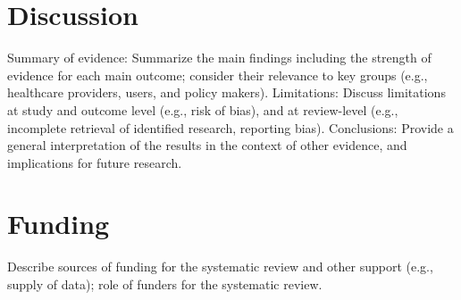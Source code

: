\documentclass{article}\usepackage[]{graphicx}\usepackage[]{color}
\begin{document}
\section{Discussion}

                Summary of evidence: Summarize the main findings including the strength of evidence for each main outcome; consider their relevance to key groups (e.g., healthcare providers, users, and policy makers).
                Limitations: Discuss limitations at study and outcome level (e.g., risk of bias), and at review-level (e.g., incomplete retrieval of identified research, reporting bias).
                Conclusions: Provide a general interpretation of the results in the context of other evidence, and implications for future research.
                

\section{Funding}

Describe sources of funding for the systematic review and other support (e.g., supply of data); role of funders for the systematic review.
                  
\end{document}
